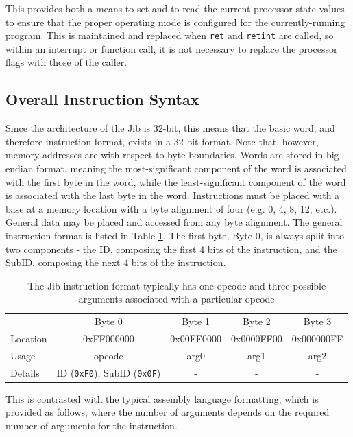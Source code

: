 \documentclass{article}
\begin{document}
This provides both a means to set and to read the current processor state values to ensure that the proper operating mode is configured for the currently-running program. This is maintained and replaced when \texttt{ret} and \texttt{retint} are called, so within an interrupt or function call, it is not necessary to replace the processor flags with those of the caller.

\subsection{Overall Instruction Syntax}

Since the architecture of the Jib is 32-bit, this means that the basic word, and therefore instruction format, exists in a 32-bit format. Note that, however, memory addresses are with respect to byte boundaries. Words are stored in big-endian format, meaning the most-significant component of the word is associated with the first byte in the word, while the least-significant component of the word is associated with the last byte in the word. Instructions must be placed with a base at a memory location with a byte alignment of four (e.g. 0, 4, 8, 12, etc.). General data may be placed and accessed from any byte alignment. The general instruction format is listed  in Table \ref{table:instruction-formatting}. The first byte, Byte 0, is always split into two components - the ID, composing the first 4 bits of the instruction, and the SubID, composing the next 4 bits of the instruction.

\begin{table}[h!]
    \centering
    \begin{tabular}{l|cccc}
        \hline
        {} & Byte 0 & Byte 1 & Byte 2 & Byte 3 \\
        Location & 0xFF000000 & 0x00FF0000 & 0x0000FF00 & 0x000000FF \\
        \hline
        Usage & opcode & arg0 & arg1 & arg2 \\
        Details & ID (\texttt{0xF0}), SubID (\texttt{0x0F}) & - & - & - \\
        \hline
    \end{tabular}
    \caption{The Jib instruction format typically has one opcode and three possible arguments associated with a particular opcode}
    \label{table:instruction-formatting}
\end{table}

This is contrasted with the typical assembly language formatting, which is provided as follows, where the number of arguments depends on the required number of arguments for the instruction.
\end{document}

